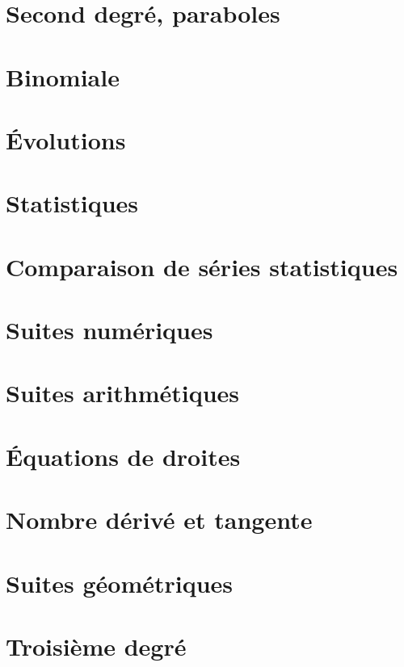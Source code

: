 \documentclass[a4paper,12pt]{book}
\begin{document}
\chapter{Second degré, paraboles}


\chapter{Binomiale}


\chapter{Évolutions}


\chapter{Statistiques}


\chapter{Comparaison de séries statistiques}


\chapter{Suites numériques}


\chapter{Suites arithmétiques}


\chapter{Équations de droites}


\chapter{Nombre dérivé et tangente}


\chapter{Suites géométriques}


\chapter{Troisième degré}

\end{document}
